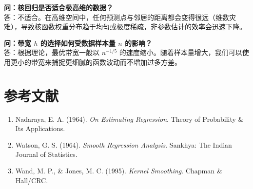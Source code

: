 \documentclass[12pt, a4paper]{article}
\begin{document}
\textbf{问：核回归是否适合极高维的数据？}\\
答：不适合。在高维空间中，任何预测点与邻居的距离都会变得很远（维数灾难），导致核函数权重分布趋于均匀或极度稀疏，非参数估计的效率会迅速下降。

\textbf{问：带宽 $h$ 的选择如何受数据样本量 $n$ 的影响？}\\
答：根据理论，最优带宽一般以 $n^{-1/5}$ 的速度缩小。随着样本量增大，我们可以使用更小的带宽来捕捉更细腻的函数波动而不增加过多方差。

\section{参考文献}
\begin{enumerate}
    \item Nadaraya, E. A. (1964). \textit{On Estimating Regression}. Theory of Probability \& Its Applications.
    \item Watson, G. S. (1964). \textit{Smooth Regression Analysis}. Sankhya: The Indian Journal of Statistics.
    \item Wand, M. P., \& Jones, M. C. (1995). \textit{Kernel Smoothing}. Chapman \& Hall/CRC.
\end{enumerate}
\end{document}
